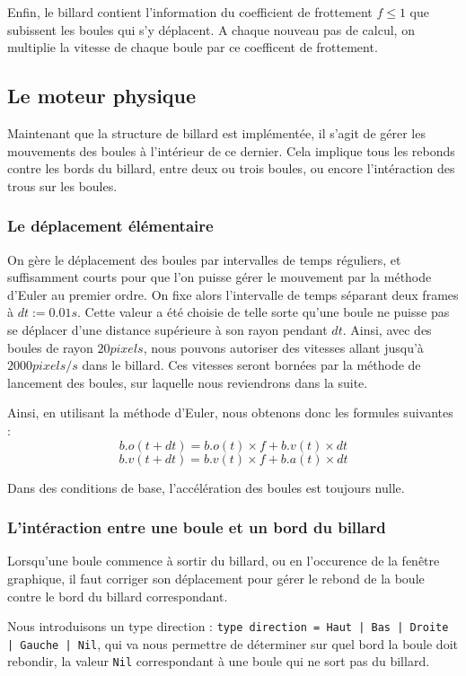\documentclass[a4paper,11pt]{article}
\begin{document}
Enfin, le billard contient l'information du coefficient de frottement $f \leqslant 1$ que subissent 
les boules qui s'y déplacent. A chaque nouveau pas de calcul, on multiplie la vitesse de chaque boule
par ce coefficent de frottement.

\subsection{Le moteur physique}
Maintenant que la structure de billard est implémentée, il s'agit de gérer les mouvements des boules
à l'intérieur de ce dernier. Cela implique tous les rebonds contre les bords du billard, entre deux
ou trois boules, ou encore l'intéraction des trous sur les boules.

\subsubsection{Le déplacement élémentaire}
On gère le déplacement des boules par intervalles de temps réguliers, et suffisamment courts pour que
l'on puisse gérer le mouvement par la méthode d'Euler au premier ordre. On fixe alors l'intervalle de
temps séparant deux frames à $dt := 0.01s$. Cette valeur a été choisie de telle sorte qu'une boule
ne puisse pas se déplacer d'une distance supérieure à son rayon pendant $dt$. Ainsi, avec des boules
de rayon $20 pixels$, nous pouvons autoriser des vitesses allant jusqu'à $2000 pixels/s$ dans le 
billard. Ces vitesses seront bornées par la méthode de lancement des boules, sur laquelle nous reviendrons
dans la suite.

Ainsi, en utilisant la méthode d'Euler, nous obtenons donc les formules suivantes :
\[b.o(t + dt) = b.o(t)\times f + b.v(t)\times dt\]
\[b.v(t + dt) = b.v(t)\times f + b.a(t)\times dt\]

Dans des conditions de base, l'accélération des boules est toujours nulle.

\subsubsection{L'intéraction entre une boule et un bord du billard}
Lorsqu'une boule commence à sortir du billard, ou en l'occurence de la fenêtre graphique, il faut
corriger son déplacement pour gérer le rebond de la boule contre le bord du billard correspondant.

Nous introduisons un type direction : \texttt{type direction = Haut | Bas | Droite | Gauche | Nil}, qui va
nous permettre de déterminer sur quel bord la boule doit rebondir, la valeur \texttt{Nil} correspondant à
une boule qui ne sort pas du billard.
\end{document}
